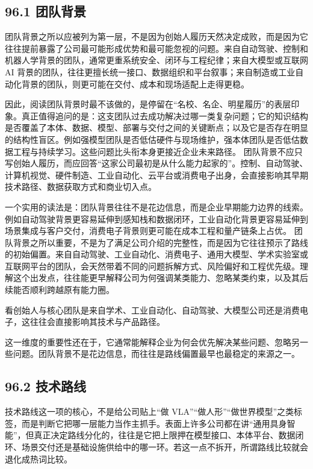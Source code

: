 \subsection*{96.1 团队背景}


团队背景之所以应被列为第一层，不是因为创始人履历天然决定成败，而是因为它往往提前暴露了公司最可能形成优势和最可能忽视的问题。来自自动驾驶、控制和机器人学背景的团队，通常更重系统安全、闭环与工程纪律；来自大模型或互联网 AI 背景的团队，往往更擅长统一接口、数据组织和平台叙事；来自制造或工业自动化背景的团队，则更可能在交付、成本和现场适配上走得更稳。

因此，阅读团队背景时最不该做的，是停留在“名校、名企、明星履历”的表层印象。真正值得追问的是：这支团队过去成功解决过哪一类复杂问题；它的知识结构是否覆盖了本体、数据、模型、部署与交付之间的关键断点；以及它是否存在明显的结构性盲区。例如强模型团队是否低估硬件与现场维护，强本体团队是否低估数据工程与持续学习。这些问题比头衔本身更接近企业未来路径。 团队背景不应只写创始人履历，而应回答“这家公司最初是从什么能力起家的”。控制、自动驾驶、计算机视觉、硬件制造、工业自动化、云平台或消费电子出身，会直接影响其早期技术路径、数据获取方式和商业切入点。

一个实用的读法是：团队背景往往不是花边信息，而是企业早期能力边界的线索。例如自动驾驶背景更容易延伸到感知栈和数据闭环，工业自动化背景更容易延伸到场景集成与客户交付，消费电子背景则更可能在成本工程和量产链条上占优。 团队背景之所以重要，不是为了满足公司介绍的完整性，而是因为它往往预示了路线的初始偏置。来自自动驾驶、工业自动化、消费电子、通用大模型、学术实验室或互联网平台的团队，会天然带着不同的问题拆解方式、风险偏好和工程优先级。理解这个出发点，往往能更早解释公司为何强调某类能力、忽略某类约束，以及其后续能否顺利跨越原有能力圈。

看创始人与核心团队是来自学术、工业自动化、自动驾驶、大模型公司还是消费电子，这往往会直接影响其技术与产品路径。

这一维度的重要性还在于，它通常能解释企业为何会优先解决某些问题、忽略另一些问题。团队背景不是花边信息，而往往是路线偏置最早也最稳定的来源之一。

\subsection*{96.2 技术路线}


技术路线这一项的核心，不是给公司贴上“做 VLA”“做人形”“做世界模型”之类标签，而是判断它把哪一层能力当作主抓手。表面上许多公司都在讲“通用具身智能”，但真正决定路线分化的，往往是它把上限押在模型接口、本体平台、数据闭环、场景交付还是基础设施供给中的哪一环。若这一点不拆开，所谓路线比较就会退化成热词比较。

